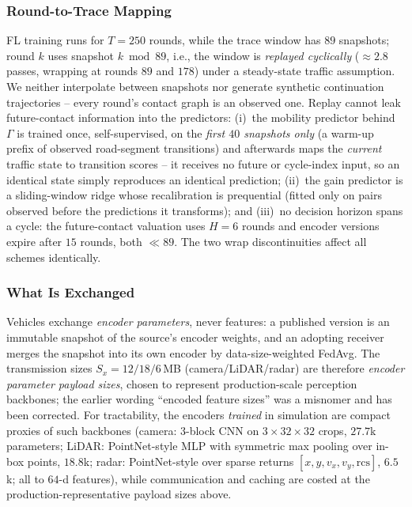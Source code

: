 \subsubsection{Round-to-Trace Mapping}
FL training runs for $T{=}250$ rounds, while the trace window has $89$
snapshots; round $k$ uses snapshot $k \bmod 89$, i.e., the window is
\emph{replayed cyclically} ($\approx 2.8$ passes, wrapping at rounds
$89$ and $178$) under a steady-state traffic assumption. We neither
interpolate between snapshots nor generate synthetic continuation
trajectories -- every round's contact graph is an observed one. Replay
cannot leak future-contact information into the predictors:
(i)~the mobility predictor behind $\Gamma$ is trained once,
self-supervised, on the \emph{first $40$ snapshots only} (a warm-up
prefix of observed road-segment transitions) and afterwards maps the
\emph{current} traffic state to transition scores -- it receives no
future or cycle-index input, so an identical state simply reproduces an
identical prediction; (ii)~the gain predictor is a sliding-window ridge
whose recalibration is prequential (fitted only on pairs observed
before the predictions it transforms); and (iii)~no decision horizon
spans a cycle: the future-contact valuation uses $H{=}6$ rounds and
encoder versions expire after $15$ rounds, both $\ll 89$. The two wrap
discontinuities affect all schemes identically.

\subsubsection{What Is Exchanged}
Vehicles exchange \emph{encoder parameters}, never features: a
published version is an immutable snapshot of the source's encoder
weights, and an adopting receiver merges the snapshot into its own
encoder by data-size-weighted FedAvg. The transmission sizes
$S_x{=}12/18/6$\,MB (camera/LiDAR/radar) are therefore \emph{encoder
parameter payload sizes}, chosen to represent production-scale
perception backbones; the earlier wording ``encoded feature sizes'' was
a misnomer and has been corrected. For tractability, the encoders
\emph{trained} in simulation are compact proxies of such backbones
(camera: 3-block CNN on $3{\times}32{\times}32$ crops, $27.7$k
parameters; LiDAR: PointNet-style MLP with symmetric max pooling over
in-box points, $18.8$k; radar: PointNet-style over sparse returns
$[x,y,v_x,v_y,\mathrm{rcs}]$, $6.5$k; all to $64$-d features), while
communication and caching are costed at the production-representative
payload sizes above.

